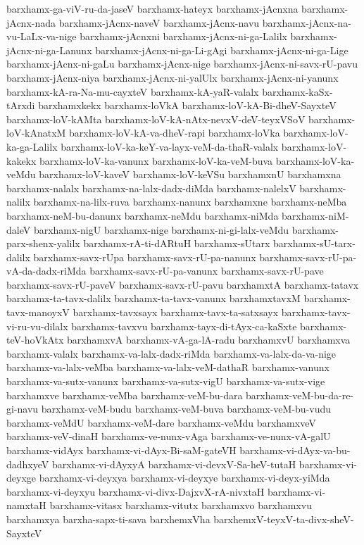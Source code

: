 {barxhamx-ga-viV-ru-da-jaseV
barxhamx-hateyx
barxhamx-jAcnxna
barxhamx-jAcnx-nada
barxhamx-jAcnx-naveV
barxhamx-jAcnx-navu
barxhamx-jAcnx-na-vu-LaLx-va-nige
barxhamx-jAcnxni
barxhamx-jAcnx-ni-ga-Lalilx
barxhamx-jAcnx-ni-ga-Lanunx
barxhamx-jAcnx-ni-ga-Li-gAgi
barxhamx-jAcnx-ni-ga-Lige
barxhamx-jAcnx-ni-gaLu
barxhamx-jAcnx-nige
barxhamx-jAcnx-ni-savx-rU-pavu
barxhamx-jAcnx-niya
barxhamx-jAcnx-ni-yalUlx
barxhamx-jAcnx-ni-yanunx
barxhamx-kA-ra-Na-mu-cayxteV
barxhamx-kA-yaR-valalx
barxhamx-kaSx-tArxdi
barxhamxkekx
barxhamx-loVkA
barxhamx-loV-kA-Bi-dheV-SayxteV
barxhamx-loV-kAMta
barxhamx-loV-kA-nAtx-nevxV-deV-teyxVSoV
barxhamx-loV-kAnatxM
barxhamx-loV-kA-va-dheV-rapi
barxhamx-loVka
barxhamx-loV-ka-ga-Lalilx
barxhamx-loV-ka-keY-va-layx-veM-da-thaR-valalx
barxhamx-loV-kakekx
barxhamx-loV-ka-vanunx
barxhamx-loV-ka-veM-buva
barxhamx-loV-ka-veMdu
barxhamx-loV-kaveV
barxhamx-loV-keVSu
barxhamxnU
barxhamxna
barxhamx-nalalx
barxhamx-na-lalx-dadx-diMda
barxhamx-nalelxV
barxhamx-nalilx
barxhamx-na-lilx-ruva
barxhamx-nanunx
barxhamxne
barxhamx-neMba
barxhamx-neM-bu-danunx
barxhamx-neMdu
barxhamx-niMda
barxhamx-niM-daleV
barxhamx-nigU
barxhamx-nige
barxhamx-ni-gi-lalx-veMdu
barxhamx-parx-shenx-yalilx
barxhamx-rA-ti-dARtuH
barxhamx-sUtarx
barxhamx-sU-tarx-dalilx
barxhamx-savx-rUpa
barxhamx-savx-rU-pa-nanunx
barxhamx-savx-rU-pa-vA-da-dadx-riMda
barxhamx-savx-rU-pa-vanunx
barxhamx-savx-rU-pave
barxhamx-savx-rU-paveV
barxhamx-savx-rU-pavu
barxhamxtA
barxhamx-tatavx
barxhamx-ta-tavx-dalilx
barxhamx-ta-tavx-vanunx
barxhamxtavxM
barxhamx-tavx-manoyxV
barxhamx-tavxsayx
barxhamx-tavx-ta-satxsayx
barxhamx-tavx-vi-ru-vu-dilalx
barxhamx-tavxvu
barxhamx-tayx-di-tAyx-ca-kaSxte
barxhamx-teV-hoVkAtx
barxhamxvA
barxhamx-vA-ga-lA-radu
barxhamxvU
barxhamxva
barxhamx-valalx
barxhamx-va-lalx-dadx-riMda
barxhamx-va-lalx-da-va-nige
barxhamx-va-lalx-veMba
barxhamx-va-lalx-veM-dathaR
barxhamx-vanunx
barxhamx-va-sutx-vanunx
barxhamx-va-sutx-vigU
barxhamx-va-sutx-vige
barxhamxve
barxhamx-veMba
barxhamx-veM-bu-dara
barxhamx-veM-bu-da-re-gi-navu
barxhamx-veM-budu
barxhamx-veM-buva
barxhamx-veM-bu-vudu
barxhamx-veMdU
barxhamx-veM-dare
barxhamx-veMdu
barxhamxveV
barxhamx-veV-dinaH
barxhamx-ve-nunx-vAga
barxhamx-ve-nunx-vA-galU
barxhamx-vidAyx
barxhamx-vi-dAyx-Bi-saM-gateVH
barxhamx-vi-dAyx-va-bu-dadhxyeV
barxhamx-vi-dAyxyA
barxhamx-vi-devxV-Sa-heV-tutaH
barxhamx-vi-deyxge
barxhamx-vi-deyxya
barxhamx-vi-deyxye
barxhamx-vi-deyx-yiMda
barxhamx-vi-deyxyu
barxhamx-vi-divx-DajxvX-rA-nivxtaH
barxhamx-vi-namxtaH
barxhamx-vitasx
barxhamx-vitutx
barxhamxvo
barxhamxvu
barxhamxya
barxha-sapx-ti-sava
barxhemxVha
barxhemxV-teyxV-ta-divx-sheV-SayxteV
}
